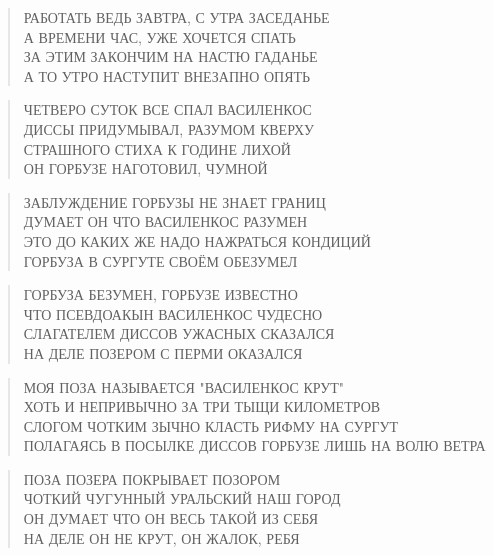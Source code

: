 \poemtitle{***}
\begin{verse}
РАБОТАТЬ ВЕДЬ ЗАВТРА, С УТРА ЗАСЕДАНЬЕ\\
А ВРЕМЕНИ ЧАС, УЖЕ ХОЧЕТСЯ СПАТЬ\\
ЗА ЭТИМ ЗАКОНЧИМ НА НАСТЮ ГАДАНЬЕ\\
А ТО УТРО НАСТУПИТ ВНЕЗАПНО ОПЯТЬ
\end{verse}

\poemtitle{***}
\begin{verse}
ЧЕТВЕРО СУТОК ВСЕ СПАЛ ВАСИЛЕНКОС\\
ДИССЫ ПРИДУМЫВАЛ, РАЗУМОМ КВЕРХУ\\
СТРАШНОГО СТИХА К ГОДИНЕ ЛИХОЙ\\
ОН ГОРБУЗЕ НАГОТОВИЛ, ЧУМНОЙ
\end{verse}

\poemtitle{***}
\begin{verse}
ЗАБЛУЖДЕНИЕ ГОРБУЗЫ НЕ ЗНАЕТ ГРАНИЦ\\
ДУМАЕТ ОН ЧТО ВАСИЛЕНКОС РАЗУМЕН\\
ЭТО ДО КАКИХ ЖЕ НАДО НАЖРАТЬСЯ КОНДИЦИЙ\\
ГОРБУЗА В СУРГУТЕ СВОЁМ ОБЕЗУМЕЛ
\end{verse}

\poemtitle{***}
\begin{verse}
ГОРБУЗА БЕЗУМЕН, ГОРБУЗЕ ИЗВЕСТНО\\
ЧТО ПСЕВДОАКЫН ВАСИЛЕНКОС ЧУДЕСНО\\
СЛАГАТЕЛЕМ ДИССОВ УЖАСНЫХ СКАЗАЛСЯ\\
НА ДЕЛЕ ПОЗЕРОМ С ПЕРМИ ОКАЗАЛСЯ
\end{verse}

\poemtitle{***}
\begin{verse}
МОЯ ПОЗА НАЗЫВАЕТСЯ "ВАСИЛЕНКОС КРУТ"\\
ХОТЬ И НЕПРИВЫЧНО ЗА ТРИ ТЫЩИ КИЛОМЕТРОВ \\
СЛОГОМ ЧОТКИМ ЗЫЧНО КЛАСТЬ РИФМУ НА СУРГУТ\\
ПОЛАГАЯСЬ В ПОСЫЛКЕ ДИССОВ ГОРБУЗЕ ЛИШЬ НА ВОЛЮ ВЕТРА
\end{verse}

\poemtitle{***}
\begin{verse}
ПОЗА ПОЗЕРА ПОКРЫВАЕТ ПОЗОРОМ\\
ЧОТКИЙ ЧУГУННЫЙ УРАЛЬСКИЙ НАШ ГОРОД\\
ОН ДУМАЕТ ЧТО ОН ВЕСЬ ТАКОЙ ИЗ СЕБЯ\\
НА ДЕЛЕ ОН НЕ КРУТ, ОН ЖАЛОК, РЕБЯ
\end{verse}

